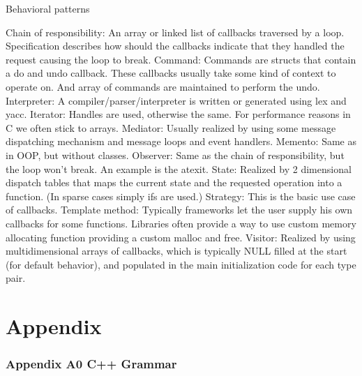 \documentclass{book}
\begin{document}
Behavioral patterns

    Chain of responsibility: An array or linked list of callbacks traversed by a loop. Specification describes how should the callbacks indicate that they handled the request causing the loop to break.
    Command: Commands are structs that contain a do and undo callback. These callbacks usually take some kind of context to operate on. And array of commands are maintained to perform the undo.
    Interpreter: A compiler/parser/interpreter is written or generated using lex and yacc.
    Iterator: Handles are used, otherwise the same. For performance reasons in C we often stick to arrays.
    Mediator: Usually realized by using some message dispatching mechanism and message loops and event handlers.
    Memento: Same as in OOP, but without classes.
    Observer: Same as the chain of responsibility, but the loop won't break. An example is the atexit.
    State: Realized by 2 dimensional dispatch tables that maps the current state and the requested operation into a function. (In sparse cases simply ifs are used.)
    Strategy: This is the basic use case of callbacks.
    Template method: Typically frameworks let the user supply his own callbacks for some functions. 
                    Libraries often provide a way to use custom memory allocating function providing a custom malloc and free.
    Visitor: Realized by using multidimensional arrays of callbacks, which is typically NULL filled at the start (for default behavior), and populated in the main initialization code for each type pair.



\part{Appendix}
\section{Appendix A0 C++ Grammar}
\end{document}
